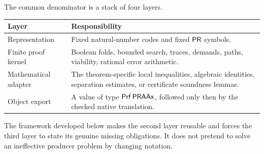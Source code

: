 The common denominator is a stack of four layers.

\begin{center}
\begin{tabularx}{0.94\textwidth}{@{}lX@{}}
\toprule
Layer & Responsibility \\
\midrule
Representation & Fixed natural-number codes and fixed \(\mathsf{PR}\) symbols. \\
Finite proof kernel & Boolean folds, bounded search, traces, demands, paths,
                      viability, rational error arithmetic. \\
Mathematical adapter & The theorem-specific local inequalities, algebraic
                       identities, separation estimates, or certificate
                       soundness lemmas. \\
Object export & A value of type \(\mathsf{Prf}\,\mathsf{PRAAx}\), followed only then by the
                checked native translation. \\
\bottomrule
\end{tabularx}
\end{center}

The framework developed below makes the second layer reusable and forces the
third layer to state its genuine missing obligations.  It does not pretend to
solve an ineffective producer problem by changing notation.
